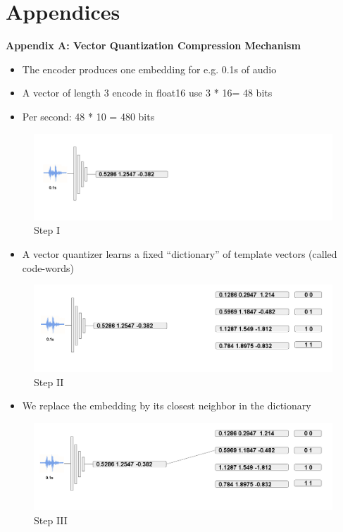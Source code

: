\documentclass[12pt]{report}
\begin{document}
\chapter{Appendices}
\textbf{Appendix A: Vector Quantization Compression Mechanism}\\
\begin{itemize}
  \item The encoder produces one embedding for e.g. 0.1s of audio
  \item A vector of length 3 encode in float16 use 3 * 16= 48 bits
  \item Per second: 48 * 10 = 480 bits
\end{itemize}
\begin{figure}[H]
\includegraphics[width=1\textwidth]{Images/compress1.png}
\caption{Step I}
\end{figure}

\begin{itemize}
  \item A vector quantizer learns a fixed “dictionary” of template vectors (called code-words)
\end{itemize}
\begin{figure}[H]
\includegraphics[width=1\textwidth]{Images/compress2.png}
\caption{Step II}
\end{figure}

\begin{itemize}
  \item We replace the embedding by its closest neighbor in the dictionary
\end{itemize}
\begin{figure}[H]
\includegraphics[width=1\textwidth]{Images/compress3.png}
\caption{Step III}
\end{figure}
\end{document}
